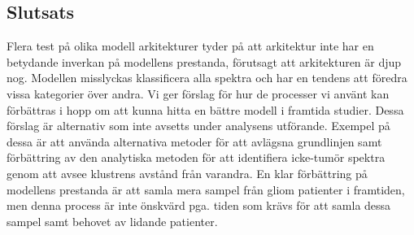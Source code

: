 \subsection*{Slutsats}

Flera test på olika modell arkitekturer tyder på att arkitektur inte har en betydande inverkan på modellens prestanda, förutsagt att arkitekturen är djup nog. Modellen misslyckas klassificera alla spektra och har en tendens att föredra vissa kategorier över andra. Vi ger förslag för hur de processer vi använt kan förbättras i hopp om att kunna hitta en bättre modell i framtida studier. Dessa förslag är alternativ som inte avsetts under analysens utförande. Exempel på dessa är att använda alternativa metoder för att avlägsna grundlinjen samt förbättring av den analytiska metoden för att identifiera icke-tumör spektra genom att avsee klustrens avstånd från varandra. En klar förbättring på modellens prestanda är att samla mera sampel från gliom patienter i framtiden, men denna process är inte önskvärd pga. tiden som krävs för att samla dessa sampel samt behovet av lidande patienter.